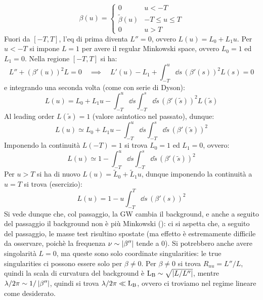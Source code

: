 \begin{equation*}
  \beta(u) =
  \begin{cases}
    0 & u < -T \\
    \tilde{\beta}(u) & -T \leq u \leq T \\
    0 & u > T
  \end{cases}
\end{equation*}
Fuori da $ [-T,T] $, l'eq di prima diventa $ L'' = 0 $, ovvero $ L(u) = L_0 + L_1 u $. Per $ u < -T $ si impone $ L = 1 $ per avere il regular Minkowski space, ovvero $ L_0 = 1 $ ed $ L_1 = 0 $. Nella regione $ [-T,T] $ si ha:
\begin{equation*}
  L'' + (\beta'(u))^2 L = 0
  \quad \implies \quad
  L'(u) - L_1 + \int_{-T}^u \dd s \, (\beta'(s))^2 L(s) = 0
\end{equation*}
e integrando una seconda volta (come con serie di Dyson):
\begin{equation*}
  L(u) = L_0 + L_1 u - \int_{-T}^u \dd s \int_{-T}^s \dd \tilde{s} \, (\beta'(\tilde{s}))^2 L(\tilde{s})
\end{equation*}
Al leading order $ L(\tilde{s}) = 1 $ (valore asintotico nel passato), dunque:
\begin{equation*}
  L(u) \simeq L_0 + L_1 u - \int_{-T}^u \dd s \int_{-T}^s \dd \tilde{s} \, (\beta'(\tilde{s}))^2
\end{equation*}
Imponendo la continuità $ L(-T) = 1 $ si trova $ L_0 = 1 $ ed $ L_1 = 0 $, ovvero:
\begin{equation}
  L(u) \simeq 1 - \int_{-T}^u \dd s \int_{-T}^s \dd \tilde{s} \, (\beta'(\tilde{s}))^2
\end{equation}
Per $ u > T $ si ha di nuovo $ L(u) = \tilde{L}_0 + \tilde{L}_1 u $, dunque imponendo la continuità a $ u = T $ si trova (esercizio):
\begin{equation*}
  L(u) = 1 - u \int_{-T}^T \dd s \, (\beta'(s))^2
\end{equation*}
Si vede dunque che, col passaggio, la GW cambia il background, e anche a seguito del passaggio il background non è più Minkowski (): ci si aspetta che, a seguito del passaggio, le masse test risultino spostate (ma effetto è estremamente difficile da osservare, poichè la frequenza $ \nu \sim \left\lvert\beta''\right\rvert $ tende a $ 0 $). Si potrebbero anche avere singolarità $ L = 0 $, ma queste sono solo coordinate singularities: le true singularities ci possono essere solo per $ \beta \neq 0 $. Per $ \beta \neq 0 $ si trova $ R_{uu} = L'' / L $, quindi la scala di curvatura del background è $ \mathrm{L}_\text{B} \sim \sqrt{\left\lvert L / L''\right\rvert} $, mentre $ \lambda/2\pi \sim 1/\left\lvert\beta''\right\rvert $, quindi si trova $ \lambda/2\pi \ll \mathrm{L}_\text{B} $, ovvero ci troviamo nel regime lineare come desiderato.

